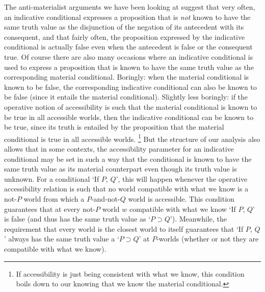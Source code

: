 \documentclass[If.tex]{subfiles}
\begin{document}
The anti-materialist arguments we have been looking at suggest that very often, an indicative conditional expresses a proposition that is \emph{not} known to have the same truth value as the disjunction of the negation of its antecedent with its consequent, and that fairly often, the proposition expressed by the indicative conditional is actually false even when the antecedent is false or the consequent true.  Of course there are also many occasions where an indicative conditional is used to express a proposition that is known to have the same truth value as the corresponding material conditional.  Boringly: when the material conditional is known to be false, the corresponding indicative conditional can also be known to be false (since it entails the material conditional).  Slightly less boringly: if the operative notion of accessibility is such that the material conditional is known to be true in all accessible worlds, then the indicative conditional can be known to be true, since its truth is entailed by the proposition that the material conditional is true in all accessible worlds.%
\footnote{If accessibility is just being consistent with what we know, this condition boils down to our knowing that we know the material conditional.}
But the structure of our analysis also allows that in some contexts, the accessibility parameter for an indicative conditional may be set in such a way that the conditional is known to have the same truth value as its material counterpart even though its truth value is unknown.  For a conditional ‘If $P$, $Q$’, this will happen whenever the operative accessibility relation is such that no world compatible with what we know is a not-$P$ world from which a $P$-and-not-$Q$ world is accessible.  This condition guarantees that at every not-$P$ world $w$ compatible with what we know ‘If $P$, $Q$’ is false (and thus has the same truth value as ‘$P⊃Q$’).  Meanwhile, the requirement that every world is the closest world to itself guarantees that ‘If $P$, $Q$’ always has the same truth value a ‘$P⊃Q$’ at $P$-worlds (whether or not they are compatible with what we know).  
\end{document}
